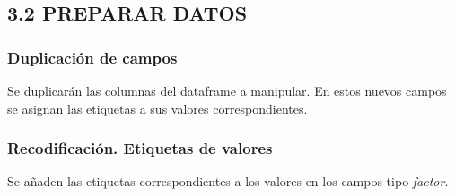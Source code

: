 \documentclass[
  12 pt,
  a4paper,
]{article}
\newenvironment{Shaded}{\begin{snugshade}}{\end{snugshade}}
\newcommand{\NormalTok}[1]{#1}
\newcommand{\OtherTok}[1]{\textcolor[rgb]{0.56,0.35,0.01}{#1}}
\newcommand{\SpecialCharTok}[1]{\textcolor[rgb]{0.81,0.36,0.00}{\textbf{#1}}}
\begin{document}
\subsection{3.2 PREPARAR DATOS}\label{preparar-datos}

\subsubsection{Duplicación de campos}\label{duplicaciuxf3n-de-campos}

Se duplicarán las columnas del dataframe a manipular. En estos nuevos
campos se asignan las etiquetas a sus valores correspondientes.

\begin{Shaded}
\end{Shaded}

\subsubsection{Recodificación. Etiquetas de
valores}\label{recodificaciuxf3n.-etiquetas-de-valores}

Se añaden las etiquetas correspondientes a los valores en los campos
tipo \emph{factor}.
\end{document}
